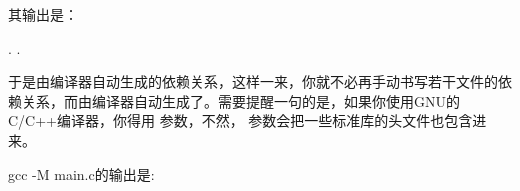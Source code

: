 \documentclass[a4paper,10pt]{sphinxmanual}
\begin{document}
\begin{sphinxVerbatim}[commandchars=\\\{\}]
  
\end{sphinxVerbatim}

其输出是：

\begin{sphinxVerbatim}[commandchars=\\\{\}]
 . .
\end{sphinxVerbatim}

于是由编译器自动生成的依赖关系，这样一来，你就不必再手动书写若干文件的依赖关系，而由编译器自动生成了。需要提醒一句的是，如果你使用GNU的C/C++编译器，你得用  参数，不然， 
参数会把一些标准库的头文件也包含进来。

gcc -M main.c的输出是:
\end{document}
